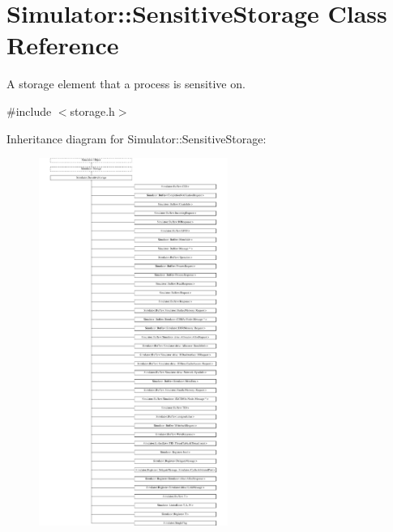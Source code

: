 \hypertarget{class_simulator_1_1_sensitive_storage}{\section{Simulator\+:\+:Sensitive\+Storage Class Reference}
\label{class_simulator_1_1_sensitive_storage}
}


A storage element that a process is sensitive on.  




{\ttfamily \#include $<$storage.\+h$>$}

Inheritance diagram for Simulator\+:\+:Sensitive\+Storage\+:\begin{figure}[H]
\begin{center}
\leavevmode
\includegraphics[height=12.000000cm]{class_simulator_1_1_sensitive_storage}
\end{center}
\end{figure}
